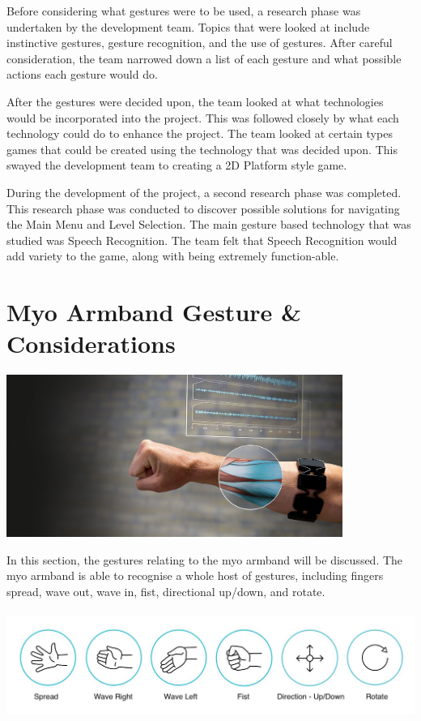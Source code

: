 \documentclass{article}
\begin{document}
\bigskip

Before considering what gestures were to be used, a research phase was undertaken by the development team. Topics that were looked at include instinctive gestures, gesture recognition, and the use of gestures. After careful consideration, the team narrowed down a list of each gesture and what possible actions each gesture would do.
\bigskip

After the gestures were decided upon, the team looked at what technologies would be incorporated into the project. This was followed closely by what each technology could do to enhance the project. The team looked at certain types games that could be created using the technology that was decided upon. This swayed the development team to creating a 2D Platform style game.
\bigskip

During the development of the project, a second research phase was completed. This research phase was conducted to discover possible solutions for navigating the Main Menu and Level Selection. The main gesture based technology that was studied was Speech Recognition. The team felt that Speech Recognition would add variety to the game, along with being extremely function-able.

\section{Myo Armband Gesture \& Considerations}
\includegraphics[width=\textwidth, height=150pt]{img/Myo.jpg}

\bigskip

In this section, the gestures relating to the myo armband will be discussed. The myo armband is able to recognise a whole host of gestures, including fingers spread, wave out, wave in, fist, directional up/down, and rotate.
\bigskip

\includegraphics[width=\textwidth, height=100pt]{img/AllMyo.jpeg}
\end{document}
